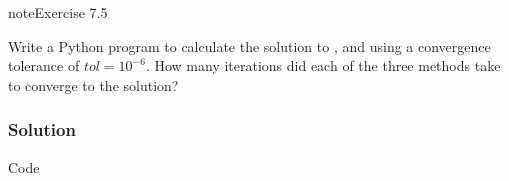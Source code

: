 \documentclass[letterpaper,10pt,english]{jupyterBook}
\begin{document}
\begin{sphinxadmonition}{note}{Exercise 7.5}

\sphinxAtStartPar
Write a Python program to calculate the solution to {\hyperref[\detokenize{7_Indirect_methods/7.6_Indirect_methods_exercises:ex7-1}]{}}, {\hyperref[\detokenize{7_Indirect_methods/7.6_Indirect_methods_exercises:ex7-2}]{}} and {\hyperref[\detokenize{7_Indirect_methods/7.6_Indirect_methods_exercises:ex7-2}]{}} using a convergence tolerance of \(tol=10^{-6}\). How many iterations did each of the three methods take to converge to the solution?
\subsubsection*{Solution}

\sphinxAtStartPar
Code

\begin{sphinxVerbatim}[commandchars=\\\{\}]
   

   
      
      
      
       
          
           
              \PYG{p}{[}\PYG{p}{]}
               
                   
                      \PYG{p}{[}\PYG{p}{]}  \PYG{p}{[}\PYG{p}{]}
        
            \PYG{p}{[}\PYG{p}{]}    \PYG{p}{[}\PYG{p}{]}
            

\end{sphinxVerbatim}
\end{sphinxadmonition}
\end{document}
